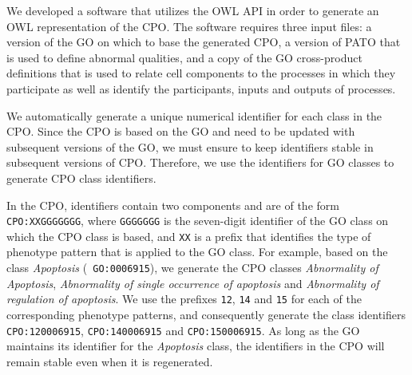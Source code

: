 \documentclass[12pt]{article}
\renewcommand{\cite}{\citep}
\begin{document}
We developed a software that utilizes the OWL API \cite{Horridge2007}
in order to generate an OWL representation of the CPO. The software
requires three input files: a version of the GO on which to base the
generated CPO, a version of PATO that is used to define abnormal
qualities, and a copy of the GO cross-product definitions
\cite{Mungall2010go} that is used to relate cell components to the
processes in which they participate as well as identify the
participants, inputs and outputs of processes.

We automatically generate a unique numerical identifier for each class
in the CPO.  Since the CPO is based on the GO and need to be updated
with subsequent versions of the GO, we must ensure to keep identifiers
stable in subsequent versions of CPO. Therefore, we use the
identifiers for GO classes to generate CPO class identifiers.

In the CPO, identifiers contain two components and are of the form
{\tt CPO:XXGGGGGGG}, where {\tt GGGGGGG} is the seven-digit identifier
of the GO class on which the CPO class is based, and {\tt XX} is a
prefix that identifies the type of phenotype pattern that is applied
to the GO class. For example, based on the class {\em Apoptosis} ({\tt
  GO:0006915}), we generate the CPO classes {\em Abnormality of
  Apoptosis}, {\em Abnormality of single occurrence of apoptosis} and
{\em Abnormality of regulation of apoptosis}.  We use the prefixes
{\tt 12}, {\tt 14} and {\tt 15} for each of the corresponding
phenotype patterns, and consequently generate the class identifiers
{\tt CPO:120006915}, {\tt CPO:140006915} and {\tt CPO:150006915}. As
long as the GO maintains its identifier for the {\em Apoptosis} class,
the identifiers in the CPO will remain stable even when it is
regenerated.
\end{document}
